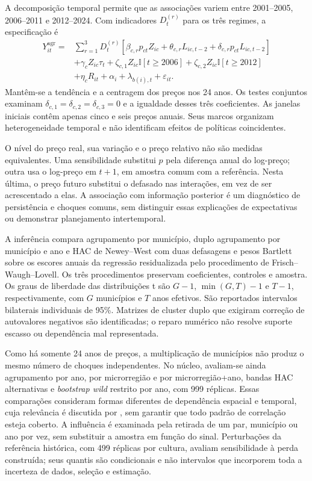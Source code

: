 A decomposição temporal permite que as associações variem entre 2001--2005, 2006--2011 e 2012--2024. Com indicadores $D_t^{(r)}$ para os três regimes, a especificação é
\begin{equation}
\begin{aligned}
Y_{it}^{\mathrm{agr}}={}&\sum_{r=1}^{3}D_t^{(r)}\left[
\beta_{c,r}p_{ct}Z_{ic}+\theta_{c,r}L_{ic,t-2}
+\delta_{c,r}p_{ct}L_{ic,t-2}\right]\\
&+\gamma_c Z_{ic}\tau_t+\zeta_{c,1}Z_{ic}\mathbb{I}[t\geq2006]
+\zeta_{c,2}Z_{ic}\mathbb{I}[t\geq2012]\\
&+\eta_cR_{it}+\alpha_i+\lambda_{b(i),t}+\varepsilon_{it}.
\end{aligned}
\label{eq:modelo-regimes}
\end{equation}
Mantêm-se a tendência e a centragem dos preços nos 24 anos. Os testes conjuntos examinam $\delta_{c,1}=\delta_{c,2}=\delta_{c,3}=0$ e a igualdade desses três coeficientes. As janelas iniciais contêm apenas cinco e seis preços anuais. Seus marcos organizam heterogeneidade temporal e não identificam efeitos de políticas coincidentes.

O nível do preço real, sua variação e o preço relativo não são medidas equivalentes. Uma sensibilidade substitui $p$ pela diferença anual do log-preço; outra usa o log-preço em $t+1$, em amostra comum com a referência. Nesta última, o preço futuro substitui o defasado nas interações, em vez de ser acrescentado a elas. A associação com informação posterior é um diagnóstico de persistência e choques comuns, sem distinguir essas explicações de expectativas ou demonstrar planejamento intertemporal.

A inferência compara agrupamento por município, duplo agrupamento por município e ano e HAC de Newey--West com duas defasagens e pesos Bartlett sobre os escores anuais da regressão residualizada pelo procedimento de Frisch--Waugh--Lovell. Os três procedimentos preservam coeficientes, controles e amostra. Os graus de liberdade das distribuições t são $G-1$, $\min(G,T)-1$ e $T-1$, respectivamente, com $G$ municípios e $T$ anos efetivos. São reportados intervalos bilaterais individuais de 95\%. Matrizes de cluster duplo que exigiram correção de autovalores negativos são identificadas; o reparo numérico não resolve suporte escasso ou dependência mal representada.

Como há somente 24 anos de preços, a multiplicação de municípios não produz o mesmo número de choques independentes. No núcleo, avaliam-se ainda agrupamento por ano, por microrregião e por microrregião+ano, bandas HAC alternativas e \textit{bootstrap wild} restrito por ano, com 999 réplicas. Essas comparações consideram formas diferentes de dependência espacial e temporal, cuja relevância é discutida por , sem garantir que todo padrão de correlação esteja coberto. A influência é examinada pela retirada de um par, município ou ano por vez, sem substituir a amostra em função do sinal. Perturbações da referência histórica, com 499 réplicas por cultura, avaliam sensibilidade à perda construída; seus quantis são condicionais e não intervalos que incorporem toda a incerteza de dados, seleção e estimação.

